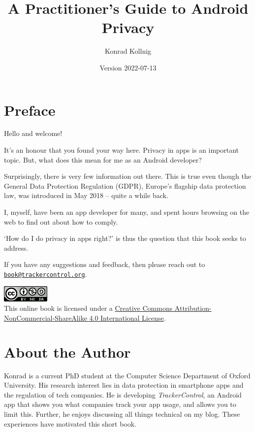 \documentclass[
]{book}
\title{A Practitioner's Guide to Android Privacy}
\author{Konrad Kollnig}
\date{Version 2022-07-13}
\begin{document}
\maketitle

{
\setcounter{tocdepth}{1}
\tableofcontents
}
\hypertarget{preface}{%
\chapter*{Preface}\label{preface}}

Hello and welcome!

It's an honour that you found your way here. Privacy in apps is an important topic. But, what does this mean for me as an Android developer?

Surprisingly, there is very few information out there. This is true even though the General Data Protection Regulation (GDPR), Europe's flagship data protection law, was introduced in May 2018 -- quite a while back.

I, myself, have been an app developer for many, and spent hours browsing on the web to find out about how to comply.

`How do I do privacy in apps right?' is thus the question that this book seeks to address.

If you have any suggestions and feedback, then please reach out to \href{mailto:book@trackercontrol.org}{\nolinkurl{book@trackercontrol.org}}.

\includegraphics{images/by-nc-sa.png}\\
This online book is licensed under a \href{http://creativecommons.org/licenses/by-nc-sa/4.0/}{Creative Commons Attribution-NonCommercial-ShareAlike 4.0 International License}.

\hypertarget{about-the-author}{%
\chapter*{About the Author}\label{about-the-author}}

Konrad is a current PhD student at the Computer Science Department of Oxford University. His research interest lies in data protection in smartphone apps and the regulation of tech companies. He is developing \emph{TrackerControl}, an Android app that shows you what companies track your app usage, and allows you to limit this. Further, he enjoys discussing all things technical on my blog. These experiences have motivated this short book.
\end{document}
